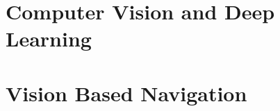 \section{Computer Vision and Deep Learning}
\label{se:computervisionanddeeplearning}


\section{Vision Based Navigation}
\label{se:visionbasednavigation}


